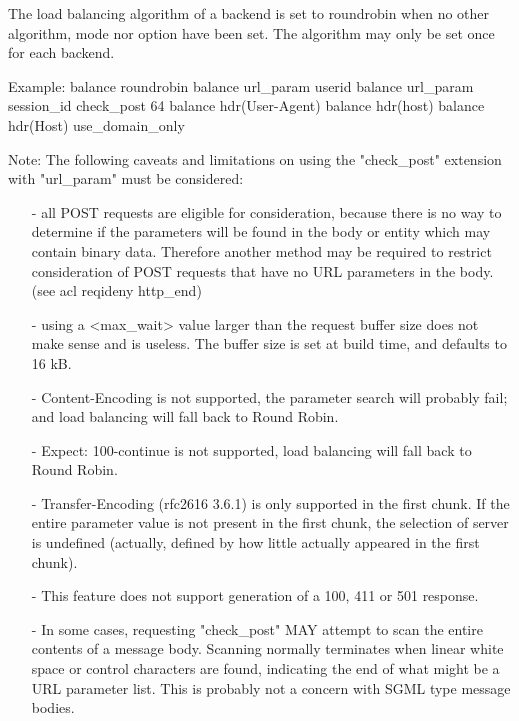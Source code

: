   The load balancing algorithm of a backend is set to roundrobin when no other
  algorithm, mode nor option have been set. The algorithm may only be set once
  for each backend.

  \begin{example}{Example:}
        balance roundrobin
        balance url_param userid
        balance url_param session_id check_post 64
        balance hdr(User-Agent)
        balance hdr(host)
        balance hdr(Host) use_domain_only
  \end{example}

  \begin{note}{Note:}
  The following caveats and limitations on using the "check\_post"
  extension with "url\_param" must be considered:
  
  \begin{itemize}
  \item[-] all POST requests are eligible for consideration, because there is no way
      to determine if the parameters will be found in the body or entity which
      may contain binary data. Therefore another method may be required to
      restrict consideration of POST requests that have no URL parameters in
      the body. (see acl reqideny http\_end)

  \item[-] using a <max\_wait> value larger than the request buffer size does not
      make sense and is useless. The buffer size is set at build time, and
      defaults to 16 kB.

  \item[-] Content-Encoding is not supported, the parameter search will probably
      fail; and load balancing will fall back to Round Robin.

  \item[-] Expect: 100-continue is not supported, load balancing will fall back to
      Round Robin.

  \item[-] Transfer-Encoding (rfc{2616} 3.6.1) is only supported in the first chunk.
      If the entire parameter value is not present in the first chunk, the
      selection of server is undefined (actually, defined by how little
      actually appeared in the first chunk).

  \item[-] This feature does not support generation of a 100, 411 or 501 response.

  \item[-] In some cases, requesting "check\_post" MAY attempt to scan the entire
      contents of a message body. Scanning normally terminates when linear
      white space or control characters are found, indicating the end of what
      might be a URL parameter list. This is probably not a concern with SGML
      type message bodies.
  \end{itemize}
  \end{note}


